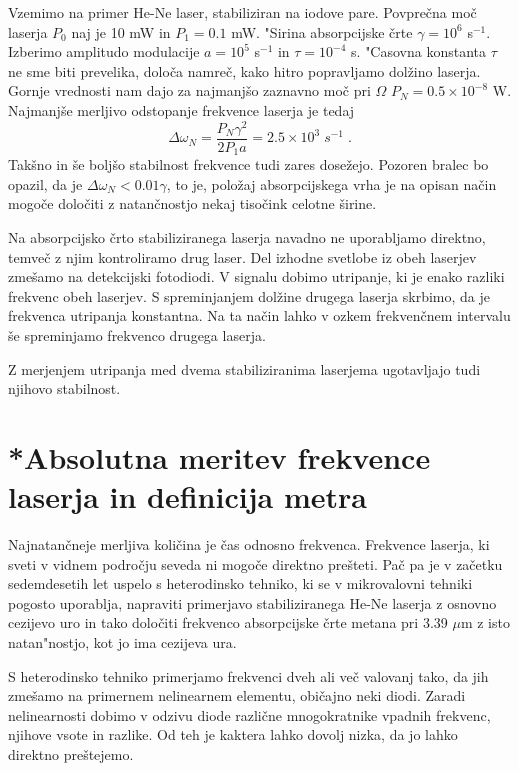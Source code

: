 Vzemimo na primer He-Ne laser, stabiliziran na iodove pare. Povprečna moč
laserja $P_0$ naj je 10 mW in $P_1=0.1 $ mW. "Sirina absorpcijske črte $%
\gamma= 10^6$ s$^{-1}$. Izberimo amplitudo modulacije $a=10^5$ s$^{-1}$ in $%
\tau=10^{-4}$ s. "Casovna konstanta $\tau$ ne sme biti prevelika, določa
namreč, kako hitro popravljamo dolžino laserja. Gornje vrednosti nam dajo
za najmanjšo zaznavno moč pri $\Omega$ $P_N=0.5\times10^{-8}$ W.
Najmanjše merljivo odstopanje frekvence laserja je tedaj 
\begin{equation}  \label{5.44}
\Delta\omega_N=\frac{P_N \gamma^2}{2P_1 a}=2.5\times 10^3\;s^{-1}\;.
\end{equation}
Takšno in še boljšo stabilnost frekvence tudi zares dosežejo. Pozoren
bralec bo opazil, da je $\Delta\omega_N<0.01 \gamma$, to je, položaj
absorpcijskega vrha je na opisan način mogoče določiti z natančnostjo
nekaj tisočink celotne širine.

Na absorpcijsko črto stabiliziranega laserja navadno ne uporabljamo
direktno, temveč z njim kontroliramo drug laser. Del izhodne svetlobe iz
obeh laserjev zmešamo na detekcijski fotodiodi. V signalu dobimo utripanje,
ki je enako razliki frekvenc obeh laserjev. S spreminjanjem dolžine drugega
laserja skrbimo, da je frekvenca utripanja konstantna. Na ta način lahko v
ozkem frekvenčnem intervalu še spreminjamo frekvenco drugega laserja.

Z merjenjem utripanja med dvema stabiliziranima laserjema ugotavljajo tudi
njihovo stabilnost.

\section{*Absolutna meritev frekvence laserja in definicija metra}

Najnatančneje merljiva količina je čas odnosno frekvenca. Frekvence
laserja, ki sveti v vidnem področju seveda ni mogoče direktno prešteti.
Pač pa je v začetku sedemdesetih let uspelo s heterodinsko tehniko, ki se
v mikrovalovni tehniki pogosto uporablja, napraviti primerjavo
stabiliziranega He-Ne laserja z osnovno cezijevo uro in tako določiti
frekvenco absorpcijske črte metana pri 3.39 $\mu$m z isto natan"nostjo, kot
jo ima cezijeva ura.

S heterodinsko tehniko primerjamo frekvenci dveh ali več valovanj tako, da
jih zmešamo na primernem nelinearnem elementu, običajno neki diodi. Zaradi
nelinearnosti dobimo v odzivu diode različne mnogokratnike vpadnih
frekvenc, njihove vsote in razlike. Od teh je kaktera lahko dovolj nizka, da
jo lahko direktno preštejemo.

